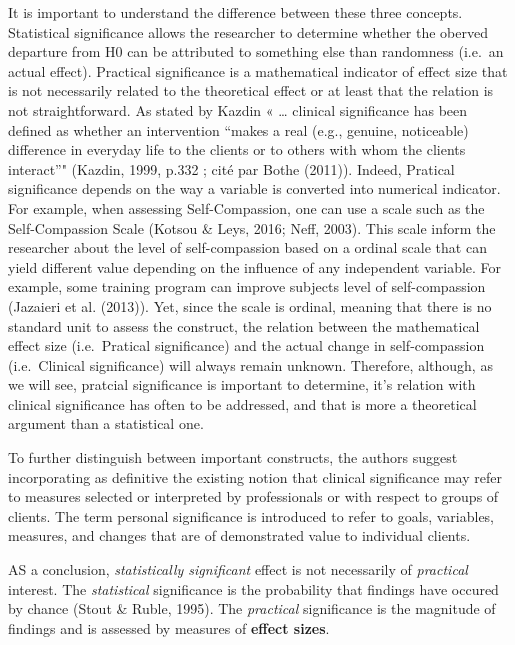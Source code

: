 \documentclass[man]{apa6}
\begin{document}
It is important to understand the difference between these three concepts. Statistical significance allows the researcher to determine whether the oberved departure from H0 can be attributed to something else than randomness (i.e.~an actual effect). Practical significance is a mathematical indicator of effect size that is not necessarily related to the theoretical effect or at least that the relation is not straightforward. As stated by Kazdin « \ldots{} clinical significance has been defined as whether an intervention \enquote{makes a real (e.g., genuine, noticeable) difference in everyday life to the clients or to others with whom the clients interact}" (Kazdin, 1999, p.332 ; cité par Bothe (2011)). Indeed, Pratical significance depends on the way a variable is converted into numerical indicator. For example, when assessing Self-Compassion, one can use a scale such as the Self-Compassion Scale (Kotsou \& Leys, 2016; Neff, 2003). This scale inform the researcher about the level of self-compassion based on a ordinal scale that can yield different value depending on the influence of any independent variable. For example, some training program can improve subjects level of self-compassion (Jazaieri et al. (2013)). Yet, since the scale is ordinal, meaning that there is no standard unit to assess the construct, the relation between the mathematical effect size (i.e.~Pratical significance) and the actual change in self-compassion (i.e.~Clinical significance) will always remain unknown. Therefore, although, as we will see, pratcial significance is important to determine, it's relation with clinical significance has often to be addressed, and that is more a theoretical argument than a statistical one.

To further distinguish between important constructs, the authors suggest incorporating as definitive the existing notion that clinical significance may refer to measures selected or interpreted by professionals or with respect to groups of clients. The term personal significance is introduced to refer to goals, variables, measures, and changes that are of demonstrated value to individual clients.

AS a conclusion, \emph{statistically significant} effect is not necessarily of \emph{practical} interest. The \emph{statistical} significance is the probability that findings have occured by chance (Stout \& Ruble, 1995). The \emph{practical} significance is the magnitude of findings and is assessed by measures of \textbf{effect sizes}.
\end{document}
